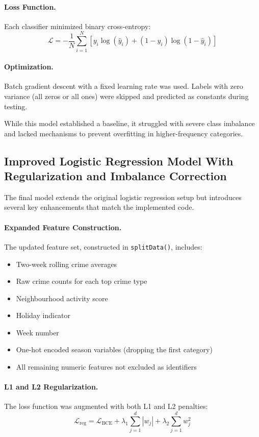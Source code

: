 \documentclass[11pt]{article}
\begin{document}
\paragraph{Loss Function.}
Each classifier minimized binary cross-entropy:
\[
\mathcal{L} = -\frac{1}{N}\sum_{i=1}^N 
\left[ y_i \log(\hat{y}_i) + (1-y_i)\log(1-\hat{y}_i) \right]
\]

\paragraph{Optimization.}
Batch gradient descent with a fixed learning rate was used.  
Labels with zero variance (all zeros or all ones) were skipped and predicted as constants during testing.

While this model established a baseline, it struggled with severe class imbalance and lacked mechanisms to prevent overfitting in higher-frequency categories.

\subsection{Improved Logistic Regression Model With Regularization and Imbalance Correction}

The final model extends the original logistic regression setup but introduces several key enhancements that match the implemented code.

\paragraph{Expanded Feature Construction.}
The updated feature set, constructed in \texttt{splitData()}, includes:
\begin{itemize}
    \item Two-week rolling crime averages
    \item Raw crime counts for each top crime type
    \item Neighbourhood activity score
    \item Holiday indicator
    \item Week number
    \item One-hot encoded season variables (dropping the first category)
    \item All remaining numeric features not excluded as identifiers
\end{itemize}

\paragraph{L1 and L2 Regularization.}
The loss function was augmented with both L1 and L2 penalties:
\[
\mathcal{L}_{\mathrm{reg}}
= \mathcal{L}_{\mathrm{BCE}}
+ \lambda_1 \sum_{j=1}^{d} |w_j|
+ \lambda_2 \sum_{j=1}^{d} w_j^{2}
\]
\end{document}
